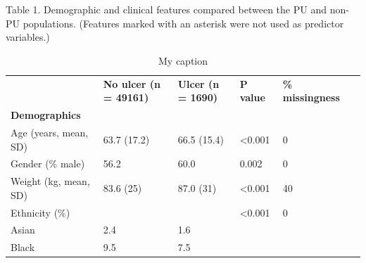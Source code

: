\documentclass{ws-procs11x85}
\begin{document}
\begin{table}[H]
\centering
\caption{My caption}
\label{tableone}
\footnotesize{ Table 1.  Demographic and clinical features compared between the PU and non-PU populations. (Features marked with an asterisk were not used as predictor variables.)}
\\
\vspace{4mm}
\begin{adjustbox}{width=1\textwidth}
\begin{tabular}{llllll}
\toprule                                   & \textbf{No ulcer (n = 49161)} & \textbf{Ulcer (n = 1690)} & \textbf{P value} & \textbf{\% missingness}  & \\
                                             
\textbf{Demographics}                        &                                         &                                     &                  &                         &  \\
\hspace{1cm} Age (years, mean, SD)                        & 63.7 (17.2)                             & 66.5 (15.4)                         & \textless 0.001  & 0                       &  \\
\hspace{1cm} Gender (\% male)                             & 56.2                                      & 60.0                                  & 0.002            & 0                       &  \\
\hspace{1cm} Weight (kg, mean, SD)                        & 83.6 (25)                                 & 87.0 (31)                             & \textless 0.001  & 40                      &  \\
\hspace{1cm} Ethnicity (\%)                               &                                         &                                     & \textless 0.001  & 0                       &  \\
\hspace{2cm} Asian                                        & 2.4                                     & 1.6                                 &                  &                         &  \\
\hspace{2cm} Black                                        & 9.5                                     & 7.5                                 &                  &                         &  \\

\end{tabular}
\end{adjustbox}
\end{table}
\end{document}
